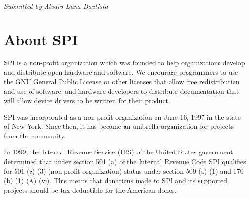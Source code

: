 \documentclass[letterpaper]{report}
\begin{document}
{\em Submitted by Alvaro Luna Bautista}


\appendix
\chapter{About SPI}

SPI is a non-profit organization which was founded to help organizations
develop and distribute open hardware and software. We encourage programmers
to use the GNU General Public License or other licenses that allow free
redistribution and use of software, and hardware developers to distribute
documentation that will allow device drivers to be written for their product.

SPI was incorporated as a non-profit organization on June 16, 1997 in the state
of New York. Since then, it has become an umbrella organization for projects
from the community.

In 1999, the Internal Revenue Service (IRS) of the United States government
determined that under section 501 (a) of the Internal Revenue Code SPI
qualifies for 501 (c) (3) (non-profit organization) status under section 509
(a) (1) and 170 (b) (1) (A) (vi). This means that donations made to SPI and its
supported projects should be tax deductible for the American donor.
\end{document}
